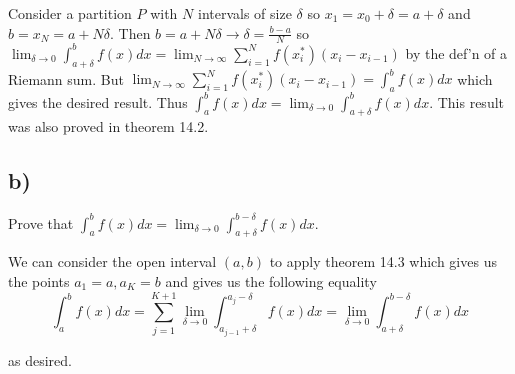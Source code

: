 \documentclass[]{article}
\begin{document}
			Consider a partition $P$ with $N$ intervals of size $\delta$ so $x_1 = x_0 + \delta = a + \delta$ and $b = x_N = a + N \delta$. Then $b = a + N \delta \to \delta = \frac{b - a}{N}$ so $\lim_{\delta \to 0}\int_{a + \delta}^b f(x)dx = \lim_{N \to \infty}\sum_{i = 1}^N f(x_i^*)(x_i - x_{i - 1})$ by the def'n of a Riemann sum. But $\lim_{N \to \infty}\sum_{i = 1}^N f(x_i^*)(x_i - x_{i - 1}) = \int_a^bf(x)dx$ which gives the desired result. Thus $\int_a^b f(x)dx = \lim_{\delta \to 0} \int_{a + \delta}^b f(x)dx$. This result was also proved in theorem 14.2. 


		\subsection*{b)}
			\begin{em}
				Prove that $\int_a^b f(x)dx = \lim_{\delta \to 0} \int_{a + \delta}^{b - \delta} f(x)dx$.
			\end{em}

			We can consider the open interval $(a, b)$ to apply theorem 14.3 which gives us the points $a_1 = a, a_K = b$ and gives us the following equality
			\[\int_a^b f(x)dx = \sum_{j = 1}^{K + 1}\lim_{\delta \to 0}\int_{a_{j - 1} + \delta}^{a_j - \delta}f(x)dx = \lim_{\delta \to 0} \int_{a + \delta}^{b - \delta} f(x)dx\]

			as desired.
\end{document}
